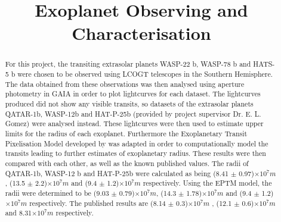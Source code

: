 \documentclass{report}
\title{\vspace{-15mm}\fontsize{24pt}{10pt}\selectfont\textbf{Exoplanet Observing and Characterisation}} %
\author{
\large
\textsc{\parbox{\linewidth}{\centering%
Tomas James\endgraf\skip
Student ID: 1158976\endgraf\bigskip}} %
\vspace{-5mm}
}
\date{\large\parbox{\linewidth}{\centering%
  Supervisor: Dr. E. L. Gomez \endgraf\bigskip\today}}
\begin{document}
\maketitle %

\thispagestyle{fancy} %


\begin{abstract}
For this project, the transiting extrasolar planets WASP-22 b, WASP-78 b and HATS-5 b were chosen to be observed using LCOGT telescopes in the Southern Hemisphere. The data obtained from these observations was then analysed using aperture photometry in GAIA in order to plot lightcurves for each dataset. The lightcurves produced did not show any visible transits, so datasets of the extrasolar planets QATAR-1b, WASP-12b and HAT-P-25b (provided by project supervisor Dr. E. L. Gomez) were analysed instead. These lightcurves were then used to estimate upper limits for the radius of each exoplanet. Furthermore the Exoplanetary Transit Pixelisation Model developed by \textcite{model} was adapted in order to computationally model the transits leading to further estimates of exoplanetary radius. These results were then compared with each other, as well as the known published values. The radii of QATAR-1b, WASP-12 b and HAT-P-25b were calculated as being (8.41 $\pm$ 0.97)$\times10^{7}m$, (13.5 $\pm$ 2.2)$\times10^{7}m$ and (9.4 $\pm$ 1.2)$\times10^{7}m$ respectively. Using the EPTM model, the radii were determined to be (9.03 $\pm$ 0.79)$\times10^{7}m$, (14.3 $\pm$ 1.78)$\times10^{7}m$ and (9.4 $\pm$ 1.2)$\times10^{7}m$ respectively. The published results are (8.14 $\pm$ 0.3)$\times10^{7}m$ \parencite{qatar1bknown}, (12.1 $\pm$ 0.6)$\times10^{7}m$ \parencite{wasp12bknown} and 8.31$\times10^{7}m$ \parencite{hatp25bknown} respectively.
\end{abstract}


\tableofcontents %
\pagebreak %

\end{document}
